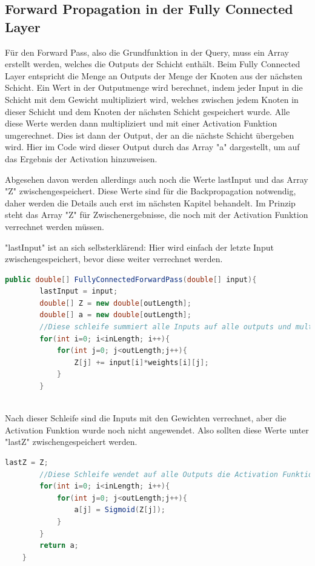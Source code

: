 \documentclass[12pt]{article}
\begin{document}
\subsection{Forward Propagation in der Fully Connected Layer}

Für den Forward Pass, also die Grundfunktion in der Query, muss ein Array erstellt werden, welches die Outputs der Schicht enthält. Beim Fully Connected Layer entspricht die Menge an Outputs der Menge der Knoten aus der nächsten Schicht. Ein Wert in der Outputmenge wird berechnet, indem jeder Input in die Schicht mit dem Gewicht multipliziert wird, welches zwischen jedem Knoten in dieser Schicht und dem Knoten der nächsten Schicht gespeichert wurde. Alle diese Werte werden dann multipliziert und mit einer Activation Funktion umgerechnet. Dies ist dann der Output, der an die nächste Schicht übergeben wird. Hier im Code wird dieser Output durch das Array "a" dargestellt, um auf das Ergebnis der Activation hinzuweisen.

Abgesehen davon werden allerdings auch noch die Werte lastInput und das Array "Z" zwischengespeichert. Diese Werte sind für die Backpropagation notwendig, daher werden die Details auch erst im nächsten Kapitel behandelt. Im Prinzip steht das Array "Z" für Zwischenergebnisse, die noch mit der Activation Funktion verrechnet werden müssen.

"lastInput" ist an sich selbsterklärend: Hier wird einfach der letzte Input zwischengespeichert, bevor diese weiter verrechnet werden.
\clearpage
\begin{lstlisting}[language=Java]
    public double[] FullyConnectedForwardPass(double[] input){
        lastInput = input;
        double[] Z = new double[outLength];
        double[] a = new double[outLength];
        //Diese schleife summiert alle Inputs auf alle outputs und multipliziert die Inputs mit ihren jeweiligen gewichten aus der weights-Matrix
        for(int i=0; i<inLength; i++){
            for(int j=0; j<outLength;j++){
                Z[j] += input[i]*weights[i][j];
            }
        }
        
\end{lstlisting}
Nach dieser Schleife sind die Inputs mit den Gewichten verrechnet, aber die Activation Funktion wurde noch nicht angewendet. Also sollten diese Werte unter "lastZ" zwischengespeichert werden.
\begin{lstlisting}[language=Java] 
        lastZ = Z;
		//Diese Schleife wendet auf alle Outputs die Activation Funktion an, in diesem Falle die Sigmoid Funktion
        for(int i=0; i<inLength; i++){
            for(int j=0; j<outLength;j++){
                a[j] = Sigmoid(Z[j]);
            }
        }
        return a;
    }
\end{lstlisting} 
\end{document}
